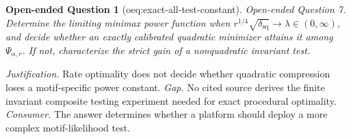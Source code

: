 \documentclass{article}
\newtheorem{openendedquestion}{Open-ended Question}
\begin{document}
\begin{openendedquestion}[oeq:exact-all-test-constant]\label{oeq:exact-all-test-constant}
Open-ended Question 7. Determine the limiting minimax power function when \(r^{1/4}\sqrt{\delta_{\mathrm{sq}}}\to\lambda\in(0,\infty)\), and decide whether an exactly calibrated quadratic minimizer attains it among \(\Psi_{\alpha,r}\). If not, characterize the strict gain of a nonquadratic invariant test.
\end{openendedquestion}
\par\smallskip\noindent \textit{Justification.} Rate optimality does not decide whether quadratic compression loses a motif-specific power constant. \textit{Gap.} No cited source derives the finite invariant composite testing experiment needed for exact procedural optimality. \textit{Consumer.} The answer determines whether a platform should deploy a more complex motif-likelihood test.
\end{document}
